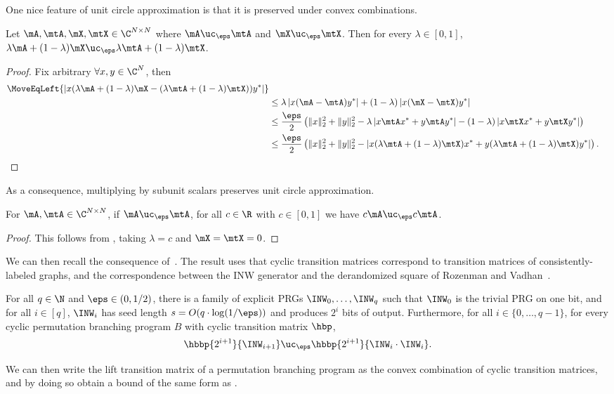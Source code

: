 \documentclass{toc}
\begin{document}
One nice feature of unit circle approximation is that it is preserved under convex combinations. %
\begin{proposition}\label{prop:UCavg}
    Let $\mA,\mtA ,\mX,\mtX\in \C^{N\times N}$ where $\mA\uc_\eps \mtA$ and $\mX \uc_\eps \mtX$. Then for every $\lambda\in [0,1]$, $\lambda \mA+(1-\lambda)\mX  \uc_\eps \lambda \mtA+(1-\lambda)\mtX$. %
\end{proposition}
\begin{proof}
    Fix arbitrary $\forall x,y \in \C^N$, then
    \begin{align*}
        \MoveEqLeft{\left| x(\lambda \mA+(1-\lambda)\mX -(\lambda \mtA+(1-\lambda)\mtX))y^* \right|}\\
        &\leq \lambda\left|x(\mA-\mtA)y^*\right|+(1-\lambda)\left|x(\mX -\mtX)y^*\right|\\
        &\leq \frac{\eps}{2}\left(\|x\|_2^2+\|y\|_2^2 - \lambda \left|x\mtA x^*+y\mtA y^*\right|-(1-\lambda)\left|x\mtX x^*+y\mtX y^*\right|\right)\\
        &\leq \frac{\eps}{2}\left(\|x\|_2^2+\|y\|_2^2 - \left|x(\lambda \mtA +(1-\lambda)\mtX )x^*+y(\lambda \mtA +(1-\lambda)\mtX )y^*\right|\right). \qedhere
    \end{align*}
\end{proof}
As a consequence, multiplying by subunit scalars preserves unit circle approximation.
\begin{corollary}\label{cor:UCscale}
    For $\mA,\mtA \in \C^{N\times N}$, if $\mA\uc_\eps \mtA$, for all $c \in \R$ with $c\in[0,1]$ we have $c\mA\uc_\eps c\mtA$.
\end{corollary}
\begin{proof}
    This follows from , taking $\lambda=c$ and $\mX=\mtX=0$.
\end{proof}
    
    We can then recall the consequence of~\cite{HozaPyVa21}. The result uses that cyclic transition matrices correspond to transition matrices of consistently-labeled graphs, and the correspondence between the INW generator and the derandomized square of Rozenman and Vadhan~\cite{RozenmanVa05}.
\begin{theorem}\label{thm:HozaPyVa21gen}
    For all $q \in \N$ and $\eps \in (0,1/2)$, there is a family of explicit PRGs $\INW_0,\ldots,\INW_q$ such that $\INW_0$ is the trivial PRG on one bit, and for all $i\in [q]$, $\INW_i$ has seed length $s=O(q\cdot\log(1/\eps))$ and produces $2^i$ bits of output. Furthermore, for all $i \in \{0,\ldots,q-1\}$, for every cyclic permutation branching program $B$ with cyclic transition matrix $\hbp$,
    \[\hbbp{2^{i+1}}{\INW_{i+1}}\uc_{\eps} \hbbp{2^{i+1}}{\INW_i\cdot\INW_i}.\]
\end{theorem}
We can then write the lift transition matrix of a permutation branching program as the convex combination of cyclic transition matrices, and by doing so obtain a bound of the same form as .
\end{document}

